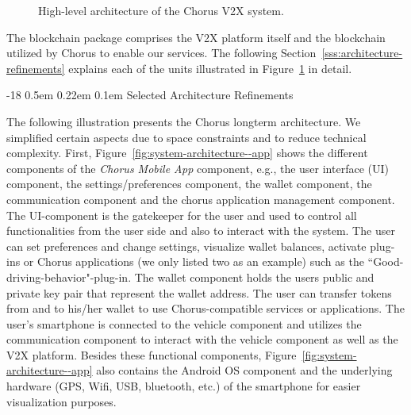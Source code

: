 \documentclass{llncs}
\makeatletter
\renewcommand\subsubsection{\@startsection{subsubsection}{3}{\z@}%
		{-18\p@ \@plus -4\p@ \@minus -4\p@}%
		{0.5em \@plus 0.22em \@minus 0.1em}%
		{\normalfont\normalsize\bfseries\boldmath}}
\makeatother
\begin{document}
{\begin{figure}
					\caption{High-level architecture of the Chorus V2X system.}	
					\label{fig:high-level-architecture}
				\end{figure}					
				The blockchain package comprises the V2X platform itself and the blockchain utilized by Chorus to enable our services. The following Section~\ref{sss:architecture-refinements} explains each of the units illustrated in Figure~\ref{fig:high-level-architecture} in detail.
			
			

			\subsubsection{Selected Architecture Refinements}
				\label{sss:architecture-refinements}
			
				The following illustration presents the Chorus longterm architecture. We simplified certain aspects due to space constraints and to reduce technical complexity. First, Figure~\ref{fig:system-architecture--app} shows the different components of the \textit{Chorus Mobile App} component, e.g., the user interface (UI) component, the settings/preferences component, the wallet component, the communication component and the chorus application management component. The UI-component is the gatekeeper for the user and used to control all functionalities from the user side and also to interact with the system. The user can set preferences and change settings, visualize wallet balances, activate plug-ins or Chorus applications (we only listed two as an example) such as the ``Good-driving-behavior"-plug-in. The wallet component holds the users public and private key pair that represent the wallet address. The user can transfer tokens from and to his/her wallet to use Chorus-compatible services or applications. The user's smartphone is connected to the vehicle component and utilizes the communication component to interact with the vehicle component as well as the V2X platform. Besides these functional components, Figure~\ref{fig:system-architecture--app} also contains the Android OS component and the underlying hardware (GPS, Wifi, USB, bluetooth, etc.) of the smartphone for easier visualization purposes.

}
\end{document}
